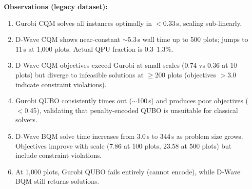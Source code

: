 \documentclass{oqireport}
\begin{document}
\noindent\textbf{Observations (legacy dataset):}
\begin{enumerate}[label=(\arabic*)]
\item Gurobi CQM solves all instances optimally in $<$0.33\,s, scaling sub-linearly.
\item D-Wave CQM shows near-constant $\sim$5.3\,s wall time up to 500 plots; jumps to 11\,s at 1,000 plots. Actual QPU fraction is 0.3--1.3\%.
\item D-Wave CQM objectives exceed Gurobi at small scales (0.74 vs 0.36 at 10 plots) but diverge to infeasible solutions at $\geq$200 plots (objectives $>$3.0 indicate constraint violations).
\item Gurobi QUBO consistently times out ($\sim$100\,s) and produces poor objectives ($<$0.45), validating that penalty-encoded QUBO is unsuitable for classical solvers.
\item D-Wave BQM solve time increases from 3.0\,s to 344\,s as problem size grows. Objectives improve with scale (7.86 at 100 plots, 23.58 at 500 plots) but include constraint violations.
\item At 1,000 plots, Gurobi QUBO fails entirely (cannot encode), while D-Wave BQM still returns solutions.
\end{enumerate}


\end{document}
